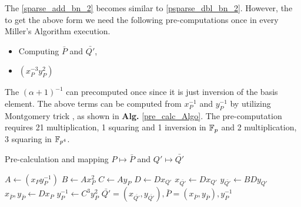 The \eqref{sparse_add_bn_2} becomes similar to \eqref{psparse_dbl_bn_2}.
However, the to get the above form we need the following pre-computations once in every Miller's Algorithm execution.
\begin{itemize}
\item Computing $\bar{P}$ and $\bar{Q'}$,
\item $(x_{P}^{-3} y_{P}^{2})$
\end{itemize}
The $(\alpha+1)^{-1}$ can precomputed once since it is just inversion of the basis element.
The above terms can be computed from $x_{P}^{-1}$ and $y_P^{-1}$ by utilizing Montgomery trick \cite{mont_trick}, as shown in \textbf{Alg.} \ref{pre_calc_Algo}. 
The pre-computation requires 21 multiplication, 1 squaring and 1 inversion in ${\mathbb{F}}_{p}$ and 2 multiplication, 3 squaring  in $\mathbb{F}_{p^4}$.

\begin{algorithm}[H]
	\caption{Pre-calculation and mapping $P \mapsto\bar{P}$ and $Q'\mapsto \bar{Q'}$}
	\label{pre_calc_Algo}
	\DontPrintSemicolon
	\hspace{-3ex}
\hspace{-3ex}
	
	\nl $A \leftarrow (x_Py_P^{-1})$\;
    \nl $B \leftarrow Ax_P^{2}$\;
    \nl $C \leftarrow Ay_P$\;
    \nl $D \leftarrow Dx_{Q'}$\;
    \nl $x_{\bar{Q'}} \leftarrow Dx_{Q'}$\;
    \nl $y_{\bar{Q'}} \leftarrow BDy_{Q'}$\;
    \nl $x_{\bar{P}}, y_{\bar{P}} \leftarrow Dx_P$\;
    \nl $y_P^{-1} \leftarrow C^3y_{P}^2$\;
	 $\bar{Q'}=(x_{\bar{Q'}},y_{\bar{Q'}}),\bar{P} = (x_{\bar{P}}, y_{\bar{P}}), y_{P}^{-1}$\;
\end{algorithm}
\vspace{-0.6em}


